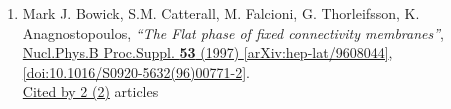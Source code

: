 \documentclass[a4paper,10pt]{article}
\begin{document}
\begin{enumerate}
\begin{enumerate}
\end{enumerate}
\item Mark J. Bowick, S.M. Catterall, M. Falcioni, G. Thorleifsson, K. Anagnostopoulos, {\it ``The Flat phase of fixed connectivity membranes''}, \href{https://www.doi.org/10.1016/S0920-5632(96)00771-2}{Nucl.Phys.B Proc.Suppl. {\bf 53} (1997) } \href{https://arxiv.org/abs/hep-lat/9608044}{[arXiv:hep-lat/9608044]}, \href{https://www.doi.org/10.1016/S0920-5632(96)00771-2}{[doi:10.1016/S0920-5632(96)00771-2]}.
\\\href{https://inspirehep.net/literature/?q=refersto%3Arecid%3A421798}{Cited by 2 (2)} articles


\end{enumerate}
\end{document}
